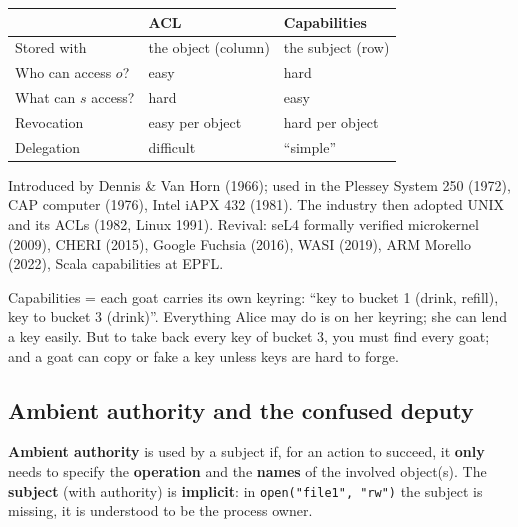 \begin{keybox}[title=ACL vs.\ capabilities]
\begin{center}
\begin{tabular}{l|l|l}
                       & \textbf{ACL}           & \textbf{Capabilities} \\ \hline
Stored with            & the object (column)    & the subject (row)     \\
Who can access $o$?    & easy                   & hard                  \\
What can $s$ access?   & hard                   & easy                  \\
Revocation             & easy per object        & hard per object       \\
Delegation             & difficult              & ``simple''
\end{tabular}
\end{center}
\end{keybox}

\begin{rembox}[title=History of capability-based security]
Introduced by Dennis \& Van Horn (1966); used in the Plessey System 250 (1972), CAP
computer (1976), Intel iAPX 432 (1981). The industry then adopted UNIX and its ACLs
(1982, Linux 1991). Revival: seL4 formally verified microkernel (2009), CHERI (2015),
Google Fuchsia (2016), WASI (2019), ARM Morello (2022), Scala capabilities at EPFL.
\end{rembox}

\begin{goatbox}
Capabilities = each goat carries its own keyring: ``key to bucket 1 (drink, refill), key to
bucket 3 (drink)''. Everything Alice may do is on her keyring; she can lend a key easily. But to
take back every key of bucket 3, you must find every goat; and a goat can copy or fake a key unless
keys are hard to forge.
\end{goatbox}

\subsection{Ambient authority and the confused deputy}

\begin{defnbox}[title=Ambient authority]
\textbf{Ambient authority} is used by a subject if, for an action to succeed, it
\textbf{only} needs to specify the \textbf{operation} and the \textbf{names} of the
involved object(s). The \textbf{subject} (with authority) is \textbf{implicit}:
in \texttt{open("file1", "rw")} the subject is missing, it is understood to be the
process owner.
\end{defnbox}


